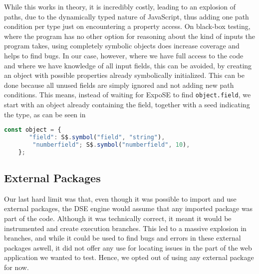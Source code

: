 While this works in theory, it is incredibly costly, leading to an explosion of paths, due to the dynamically typed nature of JavaScript, thus adding one path condition per type just on encountering a property access. On black-box testing, where the program has no other option for reasoning about the kind of inputs the program takes, using completely symbolic objects does increase coverage and helps to find bugs.
In our case, however, where we have full access to the code and where we have knowledge of all input fields, this can be avoided, by creating an object with possible properties already symbolically initialized. This can be done because all unused fields are simply ignored and not adding new path conditions. 
This means, instead of waiting for ExpoSE to find \lstinline{object.field}, we start with an object already containing the field, together with a seed indicating the type, as can be seen in 
\begin{lstlisting}[language=JavaScript, gobble=4, escapechar=@]
    const object = {
       "field": S$.symbol("field", "string"),
        "numberfield"; S$.symbol("numberfield", 10),
    };
\end{lstlisting}




\subsection{External Packages}
\label{sec:externalpack}
Our last hard limit was that, even though it was possible to import and use external packages, the DSE engine would assume that any imported package was part of the code. Although it was technically correct, it meant it would be instrumented and create execution branches. This led to a massive explosion in branches, and while it could be used to find bugs and errors in these external packages aswell, it did not offer any use for locating issues in the part of the web application we wanted to test. 
Hence, we opted out of using any external package for now.

